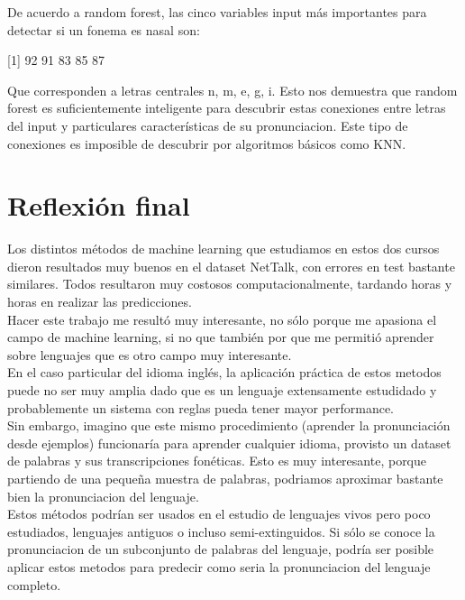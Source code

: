 \documentclass[paper=a4, fontsize=11pt]{scrartcl} %
\numberwithin{equation}{section} %
\numberwithin{figure}{section} %
\numberwithin{table}{section} %
\begin{document}
De acuerdo a random forest, las cinco variables input más importantes para detectar si un fonema es nasal son:

\begin{center}
[1]  92  91  83  85  87
\end{center}

Que corresponden a letras centrales n, m, e, g, i. Esto nos demuestra que random forest es suficientemente inteligente para descubrir estas conexiones entre letras del input y particulares características de su pronunciacion. Este tipo de conexiones es imposible de descubrir por algoritmos básicos como KNN.

\section{ Reflexión final }

Los distintos métodos de machine learning que estudiamos en estos dos cursos dieron resultados muy buenos en el dataset NetTalk, con errores en test bastante similares. Todos resultaron muy costosos computacionalmente, tardando horas y horas en realizar las predicciones. \\

Hacer este trabajo me resultó muy interesante, no sólo porque me apasiona el campo de machine learning, si no que también por que me permitió aprender sobre lenguajes que es otro campo muy interesante. \\

En el caso particular del idioma inglés, la aplicación práctica de estos metodos puede no ser muy amplia dado que es un lenguaje extensamente estudidado y probablemente un sistema con reglas pueda tener mayor performance. \\

Sin embargo, imagino que este mismo procedimiento (aprender la pronunciación desde ejemplos) funcionaría para aprender cualquier idioma, provisto un dataset de palabras y sus transcripciones fonéticas. Esto es muy interesante, porque partiendo de una pequeña muestra de palabras, podriamos aproximar bastante bien la pronunciacion del lenguaje. \\

Estos métodos podrían ser usados en el estudio de lenguajes vivos pero poco estudiados, lenguajes antiguos o incluso semi-extinguidos. Si sólo se conoce la pronunciacion de un subconjunto de palabras del lenguaje, podría ser posible aplicar estos metodos para predecir como seria la pronunciacion del lenguaje completo. \\
\end{document}
